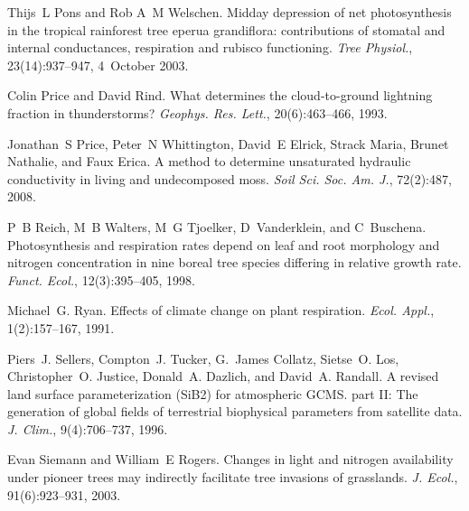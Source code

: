 \begin{DoxyDescription}
\item[\label{_CITEREF_Pons2003-f26}%
\mbox{[}47\mbox{]}]Thijs~L Pons and Rob A~M Welschen. Midday depression of net photosynthesis in the tropical rainforest tree eperua grandiflora\+: contributions of stomatal and internal conductances, respiration and rubisco functioning. {\itshape Tree Physiol.}, 23(14)\+:937--947, 4~October 2003.


\item[\label{_CITEREF_Price1993-fm}%
\mbox{[}48\mbox{]}]Colin Price and David Rind. What determines the cloud-\/to-\/ground lightning fraction in thunderstorms? {\itshape Geophys. Res. Lett.}, 20(6)\+:463--466, 1993. 


\item[\label{_CITEREF_Price2008-fr}%
\mbox{[}49\mbox{]}]Jonathan~S Price, Peter~N Whittington, David~E Elrick, Strack Maria, Brunet Nathalie, and Faux Erica. A method to determine unsaturated hydraulic conductivity in living and undecomposed moss. {\itshape Soil Sci. Soc. Am. J.}, 72(2)\+:487, 2008. 


\item[\label{_CITEREF_Reich1998-zr}%
\mbox{[}50\mbox{]}]P~B Reich, M~B Walters, M~G Tjoelker, D~Vanderklein, and C~Buschena. Photosynthesis and respiration rates depend on leaf and root morphology and nitrogen concentration in nine boreal tree species differing in relative growth rate. {\itshape Funct. Ecol.}, 12(3)\+:395--405, 1998. 


\item[\label{_CITEREF_Ryan1991-ai}%
\mbox{[}51\mbox{]}]Michael~G. Ryan. Effects of climate change on plant respiration. {\itshape Ecol. Appl.}, 1(2)\+:157--167, 1991. 


\item[\label{_CITEREF_Sellers1996-bh}%
\mbox{[}52\mbox{]}]Piers~J. Sellers, Compton~J. Tucker, G.~James Collatz, Sietse~O. Los, Christopher~O. Justice, Donald~A. Dazlich, and David~A. Randall. A revised land surface parameterization (Si\+B2) for atmospheric G\+C\+M\+S. part I\+I\+: The generation of global fields of terrestrial biophysical parameters from satellite data. {\itshape J. Clim.}, 9(4)\+:706--737, 1996. 


\item[\label{_CITEREF_Siemann2003-jl}%
\mbox{[}53\mbox{]}]Evan Siemann and William~E Rogers. Changes in light and nitrogen availability under pioneer trees may indirectly facilitate tree invasions of grasslands. {\itshape J. Ecol.}, 91(6)\+:923--931, 2003. 



\end{DoxyDescription}
